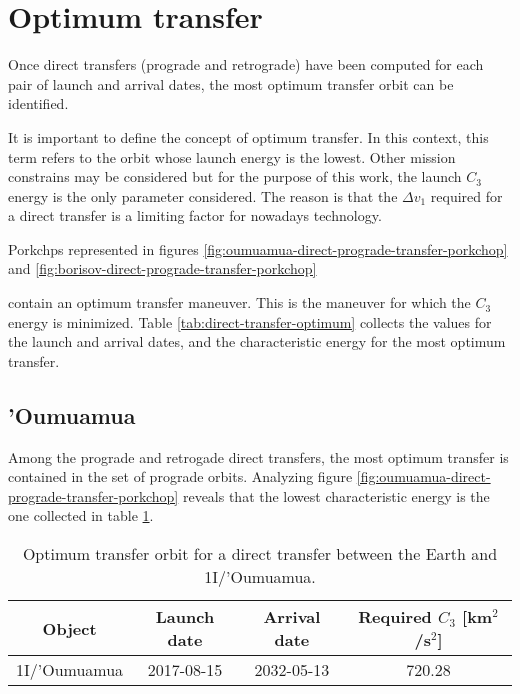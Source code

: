 \section{Optimum transfer}

Once direct transfers (prograde and retrograde) have been computed for each pair
of launch and arrival dates, the most optimum transfer orbit can be identified.

It is important to define the concept of optimum transfer. In this context, this
term refers to the orbit whose launch energy is the lowest. Other mission
constrains may be considered but for the purpose of this work, the launch $C_3$
energy is the only parameter considered. The reason is that the $\Delta v_1$
required for a direct transfer is a limiting factor for nowadays technology.

Porkchps represented in figures \ref{fig:oumuamua-direct-prograde-transfer-porkchop} and
\ref{fig:borisov-direct-prograde-transfer-porkchop}


contain an optimum transfer maneuver. This is the maneuver
for which the $C_3$ energy is minimized. Table \ref{tab:direct-transfer-optimum}
collects the values for the launch and arrival dates, and the
characteristic energy for the most optimum transfer.

\subsection{'Oumuamua}

Among the prograde and retrogade direct transfers, the most optimum transfer is
contained in the set of prograde orbits. Analyzing figure
\ref{fig:oumuamua-direct-prograde-transfer-porkchop} reveals that the lowest
characteristic energy is the one collected in table \ref{tab:oumua-direct-transfer-optimum}.

\vspace{0.5cm}
\begin{table}[H]
  \centering
  \begin{tabular}{|c|c|c|c|}
    \hline
    Object & Launch date & Arrival date & Required $C_3$ [km$^2$/s$^2$] \\
    \hline
    1I/'Oumuamua & 2017-08-15 & 2032-05-13 & 720.28 \\
    \hline
  \end{tabular}
  \caption{Optimum transfer orbit for a direct transfer between the Earth and 1I/'Oumuamua.}
  \label{tab:oumua-direct-transfer-optimum}
\end{table}

